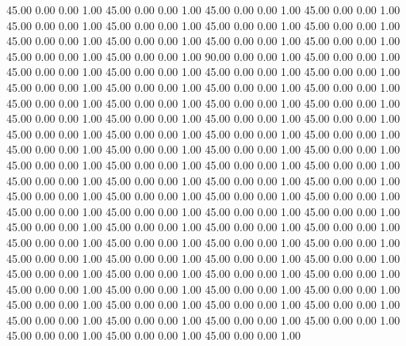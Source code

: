    45.00   0.00   0.00   1.00
   45.00   0.00   0.00   1.00
   45.00   0.00   0.00   1.00
   45.00   0.00   0.00   1.00
   45.00   0.00   0.00   1.00
   45.00   0.00   0.00   1.00
   45.00   0.00   0.00   1.00
   45.00   0.00   0.00   1.00
   45.00   0.00   0.00   1.00
   45.00   0.00   0.00   1.00
   45.00   0.00   0.00   1.00
   45.00   0.00   0.00   1.00
   45.00   0.00   0.00   1.00
   45.00   0.00   0.00   1.00
   90.00   0.00   0.00   1.00
   45.00   0.00   0.00   1.00
   45.00   0.00   0.00   1.00
   45.00   0.00   0.00   1.00
   45.00   0.00   0.00   1.00
   45.00   0.00   0.00   1.00
   45.00   0.00   0.00   1.00
   45.00   0.00   0.00   1.00
   45.00   0.00   0.00   1.00
   45.00   0.00   0.00   1.00
   45.00   0.00   0.00   1.00
   45.00   0.00   0.00   1.00
   45.00   0.00   0.00   1.00
   45.00   0.00   0.00   1.00
   45.00   0.00   0.00   1.00
   45.00   0.00   0.00   1.00
   45.00   0.00   0.00   1.00
   45.00   0.00   0.00   1.00
   45.00   0.00   0.00   1.00
   45.00   0.00   0.00   1.00
   45.00   0.00   0.00   1.00
   45.00   0.00   0.00   1.00
   45.00   0.00   0.00   1.00
   45.00   0.00   0.00   1.00
   45.00   0.00   0.00   1.00
   45.00   0.00   0.00   1.00
   45.00   0.00   0.00   1.00
   45.00   0.00   0.00   1.00
   45.00   0.00   0.00   1.00
   45.00   0.00   0.00   1.00
   45.00   0.00   0.00   1.00
   45.00   0.00   0.00   1.00
   45.00   0.00   0.00   1.00
   45.00   0.00   0.00   1.00
   45.00   0.00   0.00   1.00
   45.00   0.00   0.00   1.00
   45.00   0.00   0.00   1.00
   45.00   0.00   0.00   1.00
   45.00   0.00   0.00   1.00
   45.00   0.00   0.00   1.00
   45.00   0.00   0.00   1.00
   45.00   0.00   0.00   1.00
   45.00   0.00   0.00   1.00
   45.00   0.00   0.00   1.00
   45.00   0.00   0.00   1.00
   45.00   0.00   0.00   1.00
   45.00   0.00   0.00   1.00
   45.00   0.00   0.00   1.00
   45.00   0.00   0.00   1.00
   45.00   0.00   0.00   1.00
   45.00   0.00   0.00   1.00
   45.00   0.00   0.00   1.00
   45.00   0.00   0.00   1.00
   45.00   0.00   0.00   1.00
   45.00   0.00   0.00   1.00
   45.00   0.00   0.00   1.00
   45.00   0.00   0.00   1.00
   45.00   0.00   0.00   1.00
   45.00   0.00   0.00   1.00
   45.00   0.00   0.00   1.00
   45.00   0.00   0.00   1.00
   45.00   0.00   0.00   1.00
   45.00   0.00   0.00   1.00
   45.00   0.00   0.00   1.00
   45.00   0.00   0.00   1.00
   45.00   0.00   0.00   1.00
   45.00   0.00   0.00   1.00
   45.00   0.00   0.00   1.00
   45.00   0.00   0.00   1.00
   45.00   0.00   0.00   1.00
   45.00   0.00   0.00   1.00
   45.00   0.00   0.00   1.00
   45.00   0.00   0.00   1.00
